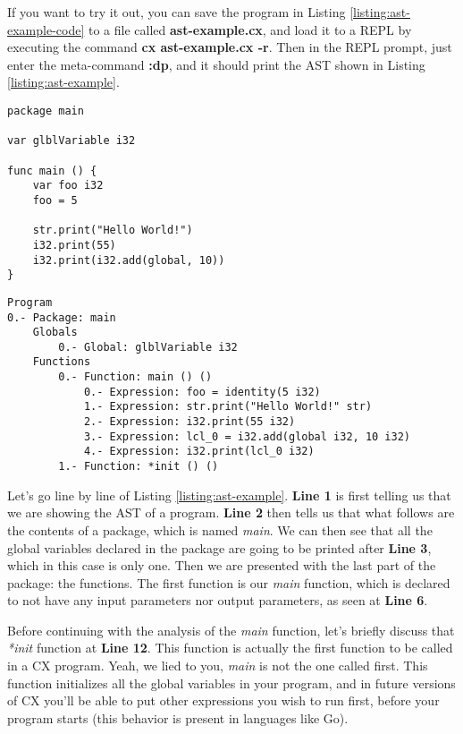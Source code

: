 \documentclass[11pt,fleqn,openany]{book} %
\begin{document}
If you want to try it out, you can save the program in Listing \ref{listing:ast-example-code} to a file called \textbf{ast-example.cx}, and load it to a REPL by executing the command \textbf{cx ast-example.cx -r}. Then in the REPL prompt, just enter the meta-command \textbf{:dp}, and it should print the AST shown in Listing \ref{listing:ast-example}.
        
\begin{lstlisting}[caption={Abstract Syntax Tree Example - Code},captionpos=b,label={listing:ast-example-code}]
package main

var glblVariable i32

func main () {
	var foo i32
	foo = 5
	
 	str.print("Hello World!")
	i32.print(55)
	i32.print(i32.add(global, 10))
}
\end{lstlisting}

\begin{lstlisting}[caption={Abstract Syntax Tree Example},captionpos=b,label={listing:ast-example}]
Program
0.- Package: main
	Globals
		0.- Global: glblVariable i32
	Functions
		0.- Function: main () ()
			0.- Expression: foo = identity(5 i32)
			1.- Expression: str.print("Hello World!" str)
			2.- Expression: i32.print(55 i32)
			3.- Expression: lcl_0 = i32.add(global i32, 10 i32)
			4.- Expression: i32.print(lcl_0 i32)
		1.- Function: *init () ()
\end{lstlisting}

Let's go line by line of Listing \ref{listing:ast-example}. \textbf{Line 1} is first telling us that we are showing the AST of a program. \textbf{Line 2} then tells us that what follows are the contents of a package, which is named \textit{main}. We can then see that all the global variables declared in the package are going to be printed after \textbf{Line 3}, which in this case is only one. Then we are presented with the last part of the package: the functions. The first function is our \textit{main} function, which is declared to not have any input parameters nor output parameters, as seen at \textbf{Line 6}.

Before continuing with the analysis of the \textit{main} function, let's briefly discuss that \textit{*init} function at \textbf{Line 12}. This function is actually the first function to be called in a CX program. Yeah, we lied to you, \textit{main} is not the one called first. This function initializes all the global variables in your program, and in future versions of CX you'll be able to put other expressions you wish to run first, before your program starts (this behavior is present in languages like Go).
\end{document}
